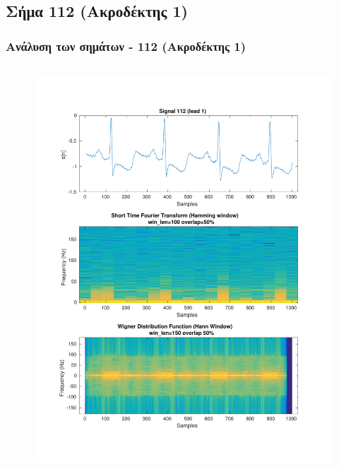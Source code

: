 \documentclass{beamer}
\begin{document}
\subsection{Σήμα 112 (Ακροδέκτης 1)}
\begin{frame}
\frametitle{Ανάλυση των σημάτων - 112 (Ακροδέκτης 1)}

\begin{columns}
\begin{figure}
\includegraphics[width=\textwidth]{fig/112l1_stft_wdf.pdf}
\end{figure}


\end{columns}
\end{frame}
\end{document}
